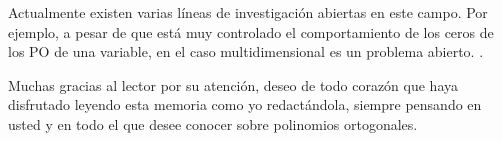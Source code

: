 Actualmente existen varias líneas de investigación abiertas en este campo. Por ejemplo, a pesar de que está muy controlado el comportamiento de los ceros de los PO de una variable, en el caso multidimensional es un problema abierto. .

Muchas gracias al lector por su atención, deseo de todo corazón que haya disfrutado leyendo esta memoria como yo redactándola, siempre pensando en usted y en todo el que desee conocer sobre polinomios ortogonales.